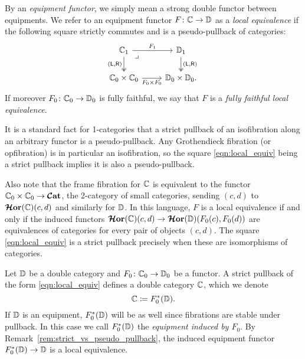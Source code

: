 \documentclass[11pt,oneside,article]{memoir}
\begin{document}
\begin{definition}
      \label{def:local_equivalence}
   By an \emph{equipment functor}, we simply mean a strong double functor between equipments.  We refer to an equipment functor $F\colon\mathbb{C}\to\mathbb{D}$ as a \emph{local equivalence} if the following square strictly commutes and is a pseudo-pullback of categories:
   \begin{equation} \begin{tikzcd}
         \label{eqn:local_equiv}
      \dcat{C}_1 \ar[r,"F_1"] \ar[d,two heads,"{(\lframe,\rframe)}"'] \ar[dr,phantom,"\lrcorner" very near start]
         & \dcat{D}_1 \ar[d,two heads,"{(\lframe,\rframe)}"] \\
      \dcat{C}_0\times\dcat{C}_0 \ar[r,"F_0\times F_0"']
         & \dcat{D}_0\times\dcat{D}_0.
   \end{tikzcd} \end{equation}
   If moreover $F_0\colon\mathbb{C}_0\to\mathbb{D}_0$ is fully faithful, we say that $F$ is a \emph{fully faithful local equivalence}.
\end{definition}

\begin{remark}
      \label{rem:strict_vs_pseudo_pullback}
   It is a standard fact for 1-categories that a strict pullback of an isofibration along an arbitrary functor is a pseudo-pullback. Any Grothendieck fibration (or opfibration) is in particular an isofibration, so the square \eqref{eqn:local_equiv} being a strict pullback implies it is also a pseudo-pullback.

   Also note that the frame fibration for $\mathbb{C}$ is equivalent to the functor $\mathbb{C}_0\times\mathbb{C}_0\to\bm{\mathcal{C}}\mathbf{at}$, the 2-category of
   small categories, sending $(c,d)$ to $\bm{\mathcal{H}}\mathbf{or}(\mathbb{C})(c,d)$ and similarly for $\mathbb{D}$.  In this language, $F$ is a local equivalence if and only if the induced functors $\bm{\mathcal{H}}\mathbf{or}(\mathbb{C})(c,d)\to\bm{\mathcal{H}}\mathbf{or}(\mathbb{D})(F_0(c),F_0(d))$ are equivalences of categories for every pair of objects $(c,d)$. The square \eqref{eqn:local_equiv} is a strict pullback precisely when these are isomorphisms of categories.
\end{remark}

\begin{definition}
      \label{def:induced_locally_equivalent_equipment}
   Let $\mathbb{D}$ be a double category and $F_0\colon\mathbb{C}_0\to\mathbb{D}_0$ be a functor. A strict pullback of the form \eqref{eqn:local_equiv} defines a double category $\mathbb{C}$, which we denote
   \[
      \mathbb{C}\coloneqq F_0^*(\mathbb{D}).
   \]
   If $\mathbb{D}$ is an equipment, $F_0^*(\mathbb{D})$ will be as well since fibrations are stable under pullback. In this case we call $F_0^*(\mathbb{D})$ the \emph{equipment induced by $F_0$}. By Remark~\ref{rem:strict_vs_pseudo_pullback}, the induced equipment functor $F_0^*(\mathbb{D})\to\mathbb{D}$ is a local equivalence.
\end{definition}
\end{document}
